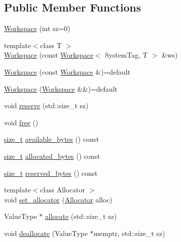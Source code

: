 \subsection*{Public Member Functions}
\begin{DoxyCompactItemize}
\item 
\hyperlink{classBC_1_1allocators_1_1fancy_1_1Workspace_a86c91e7928b70684dacb865101a9d262}{Workspace} (int sz=0)
\item 
{\footnotesize template$<$class T $>$ }\\\hyperlink{classBC_1_1allocators_1_1fancy_1_1Workspace_a05162030f9c298737e6984e4542ecfbc}{Workspace} (const \hyperlink{classBC_1_1allocators_1_1fancy_1_1Workspace}{Workspace}$<$ System\+Tag, T $>$ \&ws)
\item 
\hyperlink{classBC_1_1allocators_1_1fancy_1_1Workspace_ad6554ced71f2c2c29bf34c416fbbee23}{Workspace} (const \hyperlink{classBC_1_1allocators_1_1fancy_1_1Workspace}{Workspace} \&)=default
\item 
\hyperlink{classBC_1_1allocators_1_1fancy_1_1Workspace_a62bd9fac41797119c5085e626be688f8}{Workspace} (\hyperlink{classBC_1_1allocators_1_1fancy_1_1Workspace}{Workspace} \&\&)=default
\item 
void \hyperlink{classBC_1_1allocators_1_1fancy_1_1Workspace_ae32dc56aec8be6a24c0e9e369a0c5f01}{reserve} (std\+::size\+\_\+t sz)
\item 
void \hyperlink{classBC_1_1allocators_1_1fancy_1_1Workspace_ab0a641ae8d2b486d3b382a391887d0b4}{free} ()
\item 
\hyperlink{namespaceBC_a6007cbc4eeec401a037b558910a56173}{size\+\_\+t} \hyperlink{classBC_1_1allocators_1_1fancy_1_1Workspace_a9b406f52162013e3394aa790687c9558}{available\+\_\+bytes} () const 
\item 
\hyperlink{namespaceBC_a6007cbc4eeec401a037b558910a56173}{size\+\_\+t} \hyperlink{classBC_1_1allocators_1_1fancy_1_1Workspace_a7f958c015e551965c754dac95925a039}{allocated\+\_\+bytes} () const 
\item 
\hyperlink{namespaceBC_a6007cbc4eeec401a037b558910a56173}{size\+\_\+t} \hyperlink{classBC_1_1allocators_1_1fancy_1_1Workspace_a0fadb53779d86d49bbc4b6f9b245fa9e}{reserved\+\_\+bytes} () const 
\item 
{\footnotesize template$<$class Allocator $>$ }\\void \hyperlink{classBC_1_1allocators_1_1fancy_1_1Workspace_adb268da6b7df292eed2682ac18c0f359}{set\+\_\+allocator} (\hyperlink{namespaceBC_a934f94b17b06290e6b241e5f59930c5f}{Allocator} alloc)
\item 
Value\+Type $\ast$ \hyperlink{classBC_1_1allocators_1_1fancy_1_1Workspace_ab09fd80c3729d9a5db1ea274ed21f82a}{allocate} (std\+::size\+\_\+t sz)
\item 
void \hyperlink{classBC_1_1allocators_1_1fancy_1_1Workspace_accd6a7921d9a3d90c0359c74677e9218}{deallocate} (Value\+Type $\ast$memptr, std\+::size\+\_\+t sz)
\end{DoxyCompactItemize}
